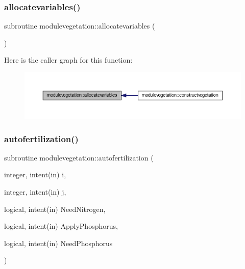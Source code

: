 \subsubsection{\texorpdfstring{allocatevariables()}{allocatevariables()}}
{\footnotesize\ttfamily subroutine modulevegetation\+::allocatevariables (\begin{DoxyParamCaption}{ }\end{DoxyParamCaption})\hspace{0.3cm}{\ttfamily [private]}}

Here is the caller graph for this function\+:\nopagebreak
\begin{figure}[H]
\begin{center}
\leavevmode
\includegraphics[width=350pt]{namespacemodulevegetation_a676fd58a37b84d4c65395b662dd8f0c6_icgraph}
\end{center}
\end{figure}
\mbox{\label{namespacemodulevegetation_a75a60d7b15cdc37b7785b839927d2153}} 
\subsubsection{\texorpdfstring{autofertilization()}{autofertilization()}}
{\footnotesize\ttfamily subroutine modulevegetation\+::autofertilization (\begin{DoxyParamCaption}\item[{integer, intent(in)}]{i,  }\item[{integer, intent(in)}]{j,  }\item[{logical, intent(in)}]{Need\+Nitrogen,  }\item[{logical, intent(in)}]{Apply\+Phosphorus,  }\item[{logical, intent(in)}]{Need\+Phosphorus }\end{DoxyParamCaption})\hspace{0.3cm}{\ttfamily [private]}}

